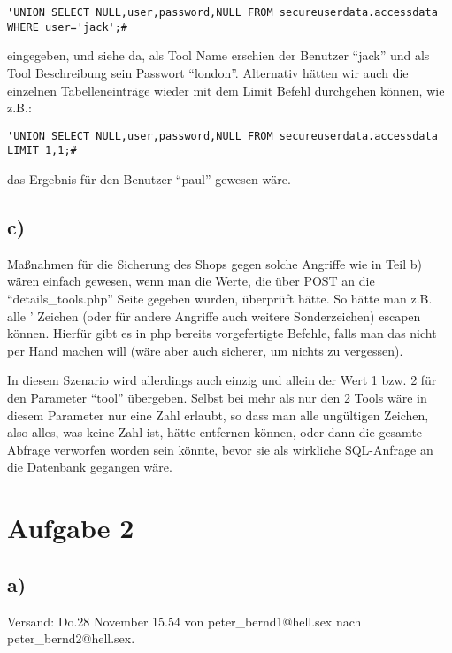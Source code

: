 \documentclass[10pt,a4paper]{article}
\begin{document}
\begin{verbatim}
'UNION SELECT NULL,user,password,NULL FROM secureuserdata.accessdata WHERE user='jack';#
\end{verbatim}

eingegeben, und siehe da, als Tool Name erschien der Benutzer "`jack"' und als Tool Beschreibung sein Passwort "`london"'. Alternativ hätten wir auch die einzelnen Tabelleneinträge wieder mit dem Limit Befehl durchgehen können, wie z.B.:

\begin{verbatim}
'UNION SELECT NULL,user,password,NULL FROM secureuserdata.accessdata LIMIT 1,1;#
\end{verbatim}

das Ergebnis für den Benutzer "`paul"' gewesen wäre.


\subsection*{c)}

Maßnahmen für die Sicherung des Shops gegen solche Angriffe wie in Teil b) wären einfach gewesen, wenn man die Werte, die über POST an die "`details\_tools.php"' Seite gegeben wurden, überprüft hätte. So hätte man z.B. alle ' Zeichen (oder für andere Angriffe auch weitere Sonderzeichen) escapen können. Hierfür gibt es in php bereits vorgefertigte Befehle, falls man das nicht per Hand machen will (wäre aber auch sicherer, um nichts zu vergessen).

In diesem Szenario wird allerdings auch einzig und allein der Wert 1 bzw. 2 für den Parameter "`tool"' übergeben. Selbst bei mehr als nur den 2 Tools wäre in diesem Parameter nur eine Zahl erlaubt, so dass man alle ungültigen Zeichen, also alles, was keine Zahl ist, hätte entfernen können, oder dann die gesamte Abfrage verworfen worden sein könnte, bevor sie als wirkliche SQL-Anfrage an die Datenbank gegangen wäre.

\section*{Aufgabe 2}

\subsection*{a)}

Versand: Do.28 November 15.54 von peter\_bernd1@hell.sex nach peter\_bernd2@hell.sex.
\end{document}
